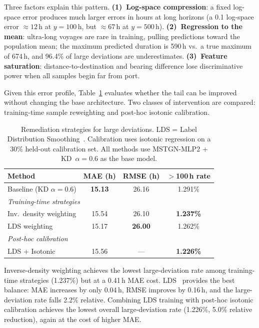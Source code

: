 \documentclass[sigconf,anonymous]{acmart}%
\begin{document}
Three factors explain this pattern.
\textbf{(1)~Log-space compression}: a fixed log-space error produces much larger errors in hours at long horizons (a 0.1 log-space error $\approx 12$\,h at $y{=}100$\,h, but $\approx 67$\,h at $y{=}500$\,h).
\textbf{(2)~Regression to the mean}: ultra-long voyages are rare in training, pulling predictions toward the population mean; the maximum predicted duration is 590\,h vs.\ a true maximum of 674\,h, and 96.4\% of large deviations are underestimates.
\textbf{(3)~Feature saturation}: distance-to-destination and bearing difference lose discriminative power when all samples begin far from port.

Given this error profile, Table~\ref{tab:remediation} evaluates whether the tail can be improved without changing the base architecture. Two classes of intervention are compared: training-time sample reweighting and post-hoc isotonic calibration.

\begin{table}[t]
    \centering
    \caption{Remediation strategies for large deviations. LDS = Label Distribution Smoothing~\cite{yang2021lds}. Calibration uses isotonic regression on a 30\% held-out calibration set. All methods use MSTGN-MLP2 + KD~$\alpha{=}0.6$ as the base model.}
    \label{tab:remediation}
    \begin{tabular}{lccc}
        \toprule
        \textbf{Method} & \textbf{MAE (h)} & \textbf{RMSE (h)} & \textbf{$>$100\,h rate} \\
        \midrule
        Baseline (KD $\alpha{=}0.6$) & \textbf{15.13} & 26.16 & 1.291\% \\
        \midrule
        \multicolumn{4}{l}{\textit{Training-time strategies}} \\
        \quad Inv.\ density weighting & 15.54 & 26.10 & \textbf{1.237\%} \\
        \quad LDS weighting          & 15.17 & \textbf{26.00} & 1.262\% \\
        \midrule
        \multicolumn{4}{l}{\textit{Post-hoc calibration}} \\
        \quad LDS + Isotonic          & 15.56 & --- & \textbf{1.226\%} \\
        \bottomrule
    \end{tabular}
\end{table}

Inverse-density weighting achieves the lowest large-deviation rate among training-time strategies (1.237\%) but at a 0.41\,h MAE cost. LDS~\cite{yang2021lds} provides the best balance: MAE increases by only 0.04\,h, RMSE improves by 0.16\,h, and the large-deviation rate falls 2.2\% relative. Combining LDS training with post-hoc isotonic calibration achieves the lowest overall large-deviation rate (1.226\%, 5.0\% relative reduction), again at the cost of higher MAE.
\end{document}
